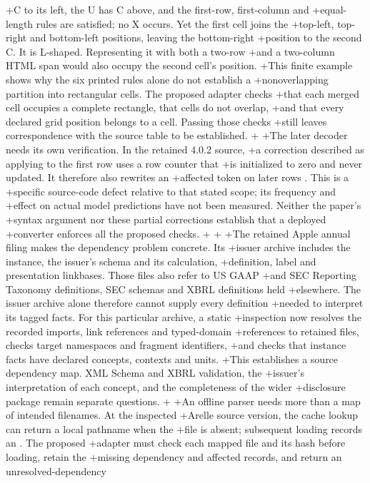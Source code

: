 +C to its left, the U has C above, and the first-row, first-column and
+equal-length rules are satisfied; no X occurs. Yet the first cell joins the
+top-left, top-right and bottom-left positions, leaving the bottom-right
+position to the second C. It is L-shaped. Representing it with both a two-row
+and a two-column HTML span would also occupy the second cell's position.
+This finite example shows why the six printed rules alone do not establish a
+nonoverlapping partition into rectangular cells. The proposed adapter checks
+that each merged cell occupies a complete rectangle, that cells do not overlap,
+and that every declared grid position belongs to a cell. Passing those checks
+still leaves correspondence with the source table to be established.
+
+The later decoder needs its own verification. In the retained 4.0.2 source,
+a correction described as applying to the first row uses a row counter that
+is initialized to zero and never updated. It therefore also rewrites an
+affected token on later rows \citep{tableformerconsumer2026}. This is a
+specific source-code defect relative to that stated scope; its frequency and
+effect on actual model predictions have not been measured. Neither the paper's
+syntax argument nor these partial corrections establish that a deployed
+converter enforces all the proposed checks.
+
+
+The retained Apple annual filing makes the dependency problem concrete. Its
+issuer archive includes the instance, the issuer's schema and its calculation,
+definition, label and presentation linkbases. Those files also refer to US GAAP
+and SEC Reporting Taxonomy definitions, SEC schemas and XBRL definitions held
+elsewhere. The issuer archive alone therefore cannot supply every definition
+needed to interpret its tagged facts. For this particular archive, a static
+inspection now resolves the recorded imports, link references and typed-domain
+references to retained files, checks target namespaces and fragment identifiers,
+and checks that instance facts have declared concepts, contexts and units.
+This establishes a source dependency map. XML Schema and XBRL validation, the
+issuer's interpretation of each concept, and the completeness of the wider
+disclosure package remain separate questions.
+
+An offline parser needs more than a map of intended filenames. At the inspected
+Arelle source version, the cache lookup can return a local pathname when the
+file is absent; subsequent loading records an . The proposed
+adapter must check each mapped file and its hash before loading, retain the
+missing dependency and affected records, and return an unresolved-dependency
